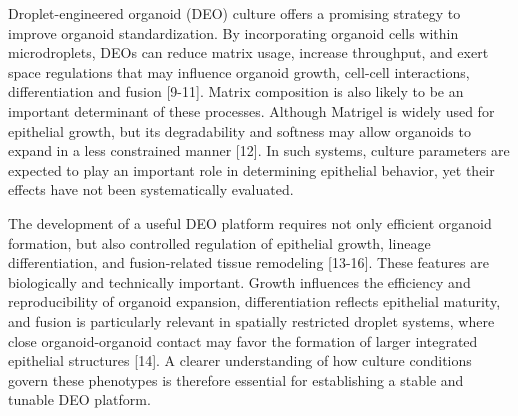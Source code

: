 \documentclass[
]{article}
\begin{document}
Droplet-engineered organoid (DEO) culture offers a promising strategy to improve organoid standardization. By incorporating organoid cells within microdroplets, DEOs can reduce matrix usage, increase throughput, and exert space regulations that may influence organoid growth, cell-cell interactions, differentiation and fusion {[}9-11{]}. Matrix composition is also likely to be an important determinant of these processes. Although Matrigel is widely used for epithelial growth, but its degradability and softness may allow organoids to expand in a less constrained manner {[}12{]}. In such systems, culture parameters are expected to play an important role in determining epithelial behavior, yet their effects have not been systematically evaluated.

The development of a useful DEO platform requires not only efficient organoid formation, but also controlled regulation of epithelial growth, lineage differentiation, and fusion-related tissue remodeling {[}13-16{]}. These features are biologically and technically important. Growth influences the efficiency and reproducibility of organoid expansion, differentiation reflects epithelial maturity, and fusion is particularly relevant in spatially restricted droplet systems, where close organoid-organoid contact may favor the formation of larger integrated epithelial structures {[}14{]}. A clearer understanding of how culture conditions govern these phenotypes is therefore essential for establishing a stable and tunable DEO platform.
\end{document}
